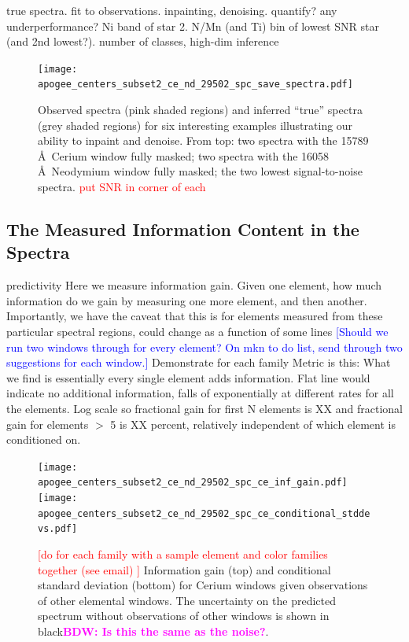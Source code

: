 \documentclass[a4paper,fleqn,usenatbib]{mnras}
\newcommand{\bdw}[1]{\textbf{\textcolor{magenta}{BDW: #1}}}
\begin{document}
true spectra. fit to observations. inpainting, denoising. quantify? any underperformance? Ni band of star 2. N/Mn (and Ti) bin of lowest SNR star (and 2nd lowest?).
number of classes, high-dim inference

\begin{figure}
	\texttt{[image: apogee\_centers\_subset2\_ce\_nd\_29502\_spc\_save\_spectra.pdf]}
    \caption{Observed spectra (pink shaded regions) and inferred ``true'' spectra (grey shaded regions) for six interesting examples illustrating our ability to inpaint and denoise. From top: two spectra with the 15789 \AA\ Cerium window fully masked; two spectra with the 16058 \AA\ Neodymium window fully masked; the two lowest signal-to-noise spectra. \textcolor{red}{put SNR in corner of each}}
    \label{fig:inpainting_denoising_examples}
\end{figure}

\subsection{The Measured Information Content in the Spectra}



predictivity
Here we measure information gain. Given one element, how much information do we gain by measuring one more element, and then another. Importantly, we have the caveat that this is for elements measured from these particular spectral regions, could change as a function of some lines \textcolor{blue}{[Should we run two windows through for every element? On mkn to do list, send through two suggestions for each window.]}
Demonstrate for each family
Metric is this: 
What we find is essentially every single element adds information. Flat line would indicate no additional information, falls of exponentially at different rates for all the elements. Log scale so fractional gain for first N elements is XX and fractional gain for elements $>$ 5 is XX percent, relatively independent of which element is conditioned on. 

\begin{figure}
	\texttt{[image: apogee\_centers\_subset2\_ce\_nd\_29502\_spc\_ce\_inf\_gain.pdf]}
	\texttt{[image: apogee\_centers\_subset2\_ce\_nd\_29502\_spc\_ce\_conditional\_stddevs.pdf]}
    \caption{\textcolor{red}{[do for each family with a sample element and color families together (see email) ]} Information gain (top) and conditional standard deviation (bottom) for Cerium windows given observations of other elemental windows. The uncertainty on the predicted spectrum without observations of other windows is shown in black\bdw{Is this the same as the noise?}.}
    \label{fig:ce_information}
\end{figure}
\end{document}

